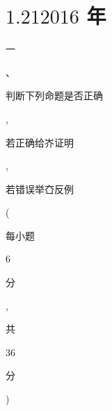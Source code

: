 \documentclass[10pt]{article}
\begin{document}
\section{$1.212016$ 年}
\begin{CJK}{UTF8}{mj}一\end{CJK}、\begin{CJK}{UTF8}{mj}判断下列命题是否正确\end{CJK}, \begin{CJK}{UTF8}{mj}若正确给岕证明\end{CJK}, \begin{CJK}{UTF8}{mj}若错误举㚎反例\end{CJK} (\begin{CJK}{UTF8}{mj}每小题\end{CJK} 6 \begin{CJK}{UTF8}{mj}分\end{CJK}, \begin{CJK}{UTF8}{mj}共\end{CJK} 36 \begin{CJK}{UTF8}{mj}分\end{CJK})
\end{document}
